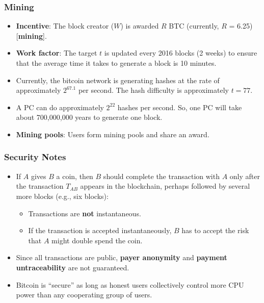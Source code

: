 \documentclass[12pt,titlepage]{article}
\begin{document}
\subsubsection{Mining}
\begin{itemize}
	\item \textbf{Incentive}: The block creator ($W$) is awarded $R$ BTC (currently, $R$ = 6.25) [\textbf{mining}].
	\item \textbf{Work factor}: The target $t$ is updated every 2016 blocks (2 weeks) to ensure that the average time it takes to generate a block is 10 minutes.
	\item Currently, the bitcoin network is generating hashes at the rate of approximately $2^{67.1}$ per second. The hash difficulty is approximately $t = 77$.
	\item A PC can do approximately $2^{22}$ hashes per second. So, one PC will take about 700,000,000 years to generate one block.
	\item \textbf{Mining pools}: Users form mining pools and share an award.
\end{itemize}
\subsubsection{Security Notes}
\begin{itemize}
	\item If $A$ gives $B$ a coin, then $B$ should complete the transaction with $A$ only after the transaction $T_{AB}$ appears in the blockchain, perhaps followed by several more blocks (e.g., six blocks): \begin{itemize}
		\item Transactions are \textbf{not} instantaneous.
		\item If the transaction is accepted instantaneously, $B$ has to accept the risk that $A$ might double spend the coin.
	\end{itemize}
	\item Since all transactions are public, \textbf{payer anonymity} and \textbf{payment untraceability} are not guaranteed.
	\item Bitcoin is ``secure'' as long as honest users collectively control more CPU power than any cooperating group of users.
\end{itemize}
\end{document}
